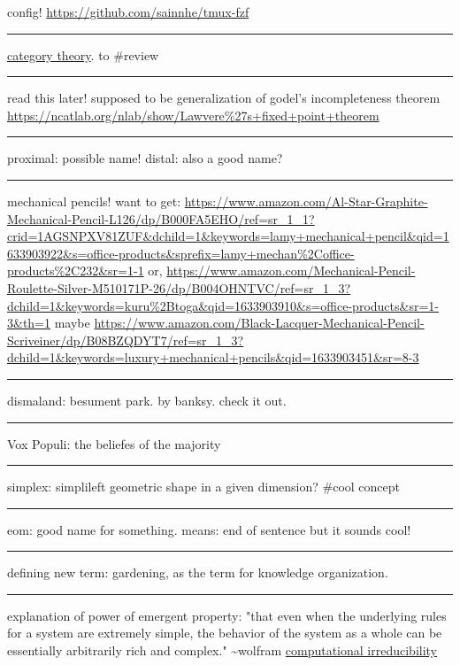 \documentclass[letterpaper]{article}
\begin{document}
config! \url{https://github.com/sainnhe/tmux-fzf}

\noindent\rule{\textwidth}{0.5pt}

\href{https://ncatlab.org/nlab/show/category+theory}{category theory}. to
\#review

\noindent\rule{\textwidth}{0.5pt}

read this later! supposed to be generalization of godel's incompleteness
theorem \url{https://ncatlab.org/nlab/show/Lawvere\%27s+fixed+point+theorem}

\noindent\rule{\textwidth}{0.5pt}

proximal: possible name! distal: also a good name?

\noindent\rule{\textwidth}{0.5pt}

mechanical pencils! want to get:
\url{https://www.amazon.com/Al-Star-Graphite-Mechanical-Pencil-L126/dp/B000FA5EHO/ref=sr\_1\_1?crid=1AGSNPXV81ZUF\&dchild=1\&keywords=lamy+mechanical+pencil\&qid=1633903922\&s=office-products\&sprefix=lamy+mechan\%2Coffice-products\%2C232\&sr=1-1}
or,
\url{https://www.amazon.com/Mechanical-Pencil-Roulette-Silver-M510171P-26/dp/B004OHNTVC/ref=sr\_1\_3?dchild=1\&keywords=kuru\%2Btoga\&qid=1633903910\&s=office-products\&sr=1-3\&th=1}
maybe
\url{https://www.amazon.com/Black-Lacquer-Mechanical-Pencil-Scriveiner/dp/B08BZQDYT7/ref=sr\_1\_3?dchild=1\&keywords=luxury+mechanical+pencils\&qid=1633903451\&sr=8-3}

\noindent\rule{\textwidth}{0.5pt}

dismaland: besument park. by banksy. check it out.

\noindent\rule{\textwidth}{0.5pt}

Vox Populi: the beliefes of the majority

\noindent\rule{\textwidth}{0.5pt}

simplex: simplileft geometric shape in a given dimension? \#cool concept

\noindent\rule{\textwidth}{0.5pt}

eom: good name for something. means: end of sentence but it sounds cool!

\noindent\rule{\textwidth}{0.5pt}

defining new term: gardening, as the term for knowledge organization.

\noindent\rule{\textwidth}{0.5pt}

explanation of power of emergent property: "that even when the
underlying rules for a system are extremely simple, the behavior of the
system as a whole can be essentially arbitrarily rich and complex."
\textasciitilde{}wolfram
\href{https://www.wolframscience.com/nks/p737--computational-irreducibility/}{computational
irreducibility}
\end{document}
